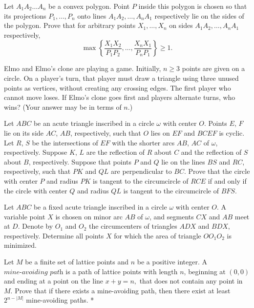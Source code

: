 \documentclass[11pt]{scrartcl}
\begin{document}
\begin{problem}[1557927271810341706]
	Let $A_1A_2 \ldots A_n$ be a convex polygon. Point $P$ inside this polygon is chosen so that its projections $P_1, \ldots , P_n$ onto lines $A_1A_2, \ldots , A_nA_1$ respectively lie on the sides of the polygon. Prove that for arbitrary points $X_1, \ldots , X_n$ on sides $A_1A_2, \ldots , A_nA_1$ respectively,
\[\max \left\{ \frac{X_1X_2}{P_1P_2}, \ldots, \frac{X_nX_1}{P_nP_1} \right\} \geq 1.\]
\end{problem}
\begin{problem}[467943798848835]
Elmo and Elmo's clone are playing a game. Initially, $n\geq 3$ points are given on a circle. On a player's turn, that player must draw a triangle using three unused points as vertices, without creating any crossing edges. The first player who cannot move loses. If Elmo's clone goes first and players alternate turns, who wins? (Your answer may be in terms of $n$.)
\end{problem}
\begin{problem}[792293045512112]
	Let $ABC$ be an acute triangle inscribed in a circle $\omega$ with center $O$. Points $E$, $F$ lie on its side $AC$, $AB$, respectively, such that $O$ lies on $EF$ and $BCEF$ is cyclic. Let $R$, $S$ be the intersections of $EF$ with the shorter arcs $AB$, $AC$ of $\omega$, respectively. Suppose $K$, $L$ are the reflection of $R$ about $C$ and the reflection of $S$ about $B$, respectively. Suppose that points $P$ and $Q$ lie on the lines $BS$ and $RC$, respectively, such that $PK$ and $QL$ are perpendicular to $BC$. Prove that the circle with center $P$ and radius $PK$ is tangent to the circumcircle of $RCE$ if and only if the circle with center $Q$ and radius $QL$ is tangent to the circumcircle of $BFS$.
\end{problem}
\begin{problem}[213513857758059]
Let $ABC$ be a fixed acute triangle inscribed in a circle $\omega$ with center $O$. A variable point $X$ is chosen on minor arc $AB$ of $\omega$, and segments $CX$ and $AB$ meet at $D$. Denote by $O_1$ and $O_2$ the circumcenters of triangles $ADX$ and $BDX$, respectively. Determine all points $X$ for which the area of triangle $OO_1O_2$ is minimized.
\end{problem}
\begin{problem}[2886276736199315342]
	Let $M$ be a finite set of lattice points and $n$ be a positive integer. A $\textit{mine-avoiding path}$ is a path of lattice points with length $n$, beginning at $(0,0)$ and ending at a point on the line $x+y=n,$ that does not contain any point in $M$. Prove that if there exists a mine-avoiding path, then there exist at least $2^{n-|M|}$ mine-avoiding paths. *
\end{problem}
\end{document}
